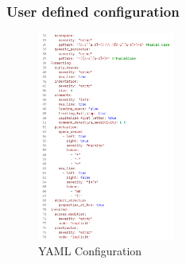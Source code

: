 
\subsubsection{User defined configuration}



\begin{figure}
    \vspace{-10px}
    \centering
    \caption{YAML Configuration}
    \label{fig:YAMLConfiguration}
    \includegraphics[width=0.4\textwidth]{Figures/YAMLConfigurationCropped.png}
\end{figure}

